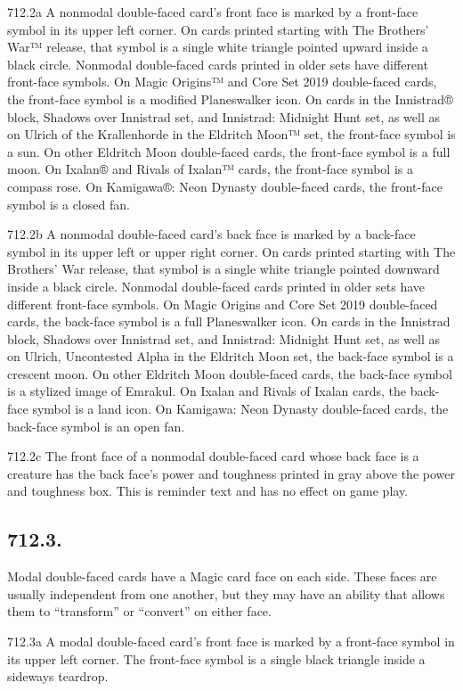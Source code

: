 712.2a A nonmodal double-faced card’s front face is marked by a front-face symbol in its upper left corner. On cards printed starting with The Brothers’ War™ release, that symbol is a single white triangle pointed upward inside a black circle. Nonmodal double-faced cards printed in older sets have different front-face symbols. On Magic Origins™ and Core Set 2019 double-faced cards, the front-face symbol is a modified Planeswalker icon. On cards in the Innistrad® block, Shadows over Innistrad set, and Innistrad: Midnight Hunt set, as well as on Ulrich of the Krallenhorde in the Eldritch Moon™ set, the front-face symbol is a sun. On other Eldritch Moon double-faced cards, the front-face symbol is a full moon. On Ixalan® and Rivals of Ixalan™ cards, the front-face symbol is a compass rose. On Kamigawa®: Neon Dynasty double-faced cards, the front-face symbol is a closed fan.

712.2b A nonmodal double-faced card’s back face is marked by a back-face symbol in its upper left or upper right corner. On cards printed starting with The Brothers’ War release, that symbol is a single white triangle pointed downward inside a black circle. Nonmodal double-faced cards printed in older sets have different front-face symbols. On Magic Origins and Core Set 2019 double-faced cards, the back-face symbol is a full Planeswalker icon. On cards in the Innistrad block, Shadows over Innistrad set, and Innistrad: Midnight Hunt set, as well as on Ulrich, Uncontested Alpha in the Eldritch Moon set, the back-face symbol is a crescent moon. On other Eldritch Moon double-faced cards, the back-face symbol is a stylized image of Emrakul. On Ixalan and Rivals of Ixalan cards, the back-face symbol is a land icon. On Kamigawa: Neon Dynasty double-faced cards, the back-face symbol is an open fan.

712.2c The front face of a nonmodal double-faced card whose back face is a creature has the back face’s power and toughness printed in gray above the power and toughness box. This is reminder text and has no effect on game play.

\subsection*{712.3.}
Modal double-faced cards have a Magic card face on each side. These faces are usually independent from one another, but they may have an ability that allows them to “transform” or “convert” on either face.

712.3a A modal double-faced card’s front face is marked by a front-face symbol in its upper left corner. The front-face symbol is a single black triangle inside a sideways teardrop.

